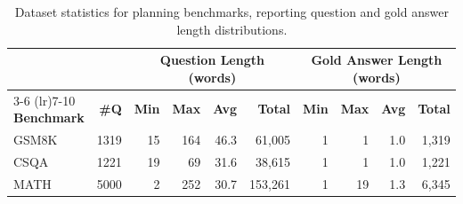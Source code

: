 \begin{table}[t]
\centering
\footnotesize
\caption{Dataset statistics for planning benchmarks, reporting question and gold answer length distributions.}
\vspace{-3mm}
\label{tab:benchmark_stats_multicol}
\begin{tabular}{l r | rrrr | rrrr}
\toprule
& & \multicolumn{4}{c|}{\textbf{Question Length (words)}} &
    \multicolumn{4}{c}{\textbf{Gold Answer Length (words)}} \\
\cmidrule(lr){3-6} \cmidrule(lr){7-10}
\textbf{Benchmark} & \textbf{\#Q} &
\textbf{Min} & \textbf{Max} & \textbf{Avg} & \textbf{Total} &
\textbf{Min} & \textbf{Max} & \textbf{Avg} & \textbf{Total} \\
\midrule
GSM8K~\cite{cobbe2021training} & 1319 & 15 & 164 & 46.3 & 61,005 & 1 & 1 & 1.0 & 1,319 \\
CSQA~\cite{talmor-etal-2019-commonsenseqa} & 1221 & 19 & 69 & 31.6 & 38,615 & 1 & 1 & 1.0 & 1,221 \\
MATH~\cite{hendrycks2measuring}  & 5000 & 2 & 252 & 30.7 & 153,261 & 1 & 19 & 1.3 & 6,345 \\
\bottomrule
\end{tabular}
\vspace{-2mm}
\end{table}